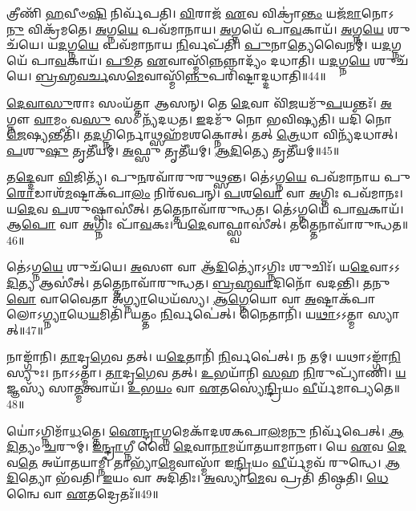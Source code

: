 𑌤𑍍𑌰𑍀𑌣𑌿᳴ \ul{𑌹}\-𑌵𑍀𑍞\-\ul{𑌷𑌿} 𑌨𑌿𑌰𑍍𑌵᳴𑌪𑌤𑌿।
\-\ul{𑌵𑌿}\-𑌰𑌾𑌜᳴ \ul{𑌏}\-𑌵 𑌵𑌿𑌕𑍍𑌰𑌾॑\-\ul{𑌨𑍍𑌤𑌂} 𑌯𑌜᳴\-\ul{𑌮𑌾}\-𑌨𑍋𑌽\-\ul{𑌨𑍁} 𑌵𑌿𑌕𑍍𑌰᳴𑌮𑌤𑍇।
\-\ul{𑌅}\-𑌗𑍍𑌨\-\ul{𑌯𑍇} 𑌪𑌵᳴𑌮𑌾𑌨𑌾𑌯।
\-\ul{𑌅}\-𑌗𑍍𑌨𑌯𑍇᳴ 𑌪𑌾\-\ul{𑌵}\-𑌕𑌾𑌯᳴।
\-\ul{𑌅}\-𑌗𑍍𑌨\-\ul{𑌯𑍇} 𑌶𑍁𑌚᳴𑌯𑍇।
𑌯\-\ul{𑌦}\-𑌗𑍍𑌨\-\ul{𑌯𑍇} 𑌪𑌵᳴𑌮𑌾𑌨𑌾𑌯 \ul{𑌨𑌿}\-𑌰𑍍𑌵𑌪᳴𑌤𑌿।
\-\ul{𑌪𑍁}\-𑌨𑌾\-\ul{𑌤𑍍𑌯𑍇}\-𑌵𑍈𑌨𑌮𑍍॑।
𑌯\-\ul{𑌦}\-𑌗𑍍𑌨𑌯𑍇᳴ 𑌪𑌾\-\ul{𑌵}\-𑌕𑌾𑌯᳴।
\-\ul{𑌪𑍂}\-𑌤 \ul{𑌏}\-𑌵𑌾𑌸𑍍𑌮𑌿᳴\-\ul{𑌨𑍍𑌨}\-𑌨𑍍𑌨𑌾𑌦𑍍𑌯𑌂᳴ 𑌦𑌧𑌾𑌤𑌿।
𑌯\-\ul{𑌦}\-𑌗𑍍𑌨\-\ul{𑌯𑍇} 𑌶𑍁𑌚᳴𑌯𑍇।
\-\ul{𑌬𑍍𑌰}\-\-\ul{𑌹𑍍𑌮}\-\-\ul{𑌵}\-\-\ul{𑌰𑍍𑌚}\-𑌸\-\ul{𑌮𑍇}\-𑌵𑌾𑌸𑍍𑌮𑌿᳴\-\ul{𑌨𑍍𑌨𑍁}\-𑌪𑌰𑌿᳴𑌷𑍍𑌟𑌾𑌦𑍍𑌦𑌧𑌾𑌤𑌿॥44॥\anuvakamend[\-\ul{𑌏}\-\-\ul{𑌨}\-\-\ul{𑌮𑌾}\-\-\ul{𑌹}\-\-\ul{𑌵}\-𑌨𑍀𑌯𑌂᳴ 𑌧𑌤𑍍𑌤𑍇\-𑌽\-\ul{𑌶𑍍𑌵}\-𑌤𑍍𑌵𑌂 𑌵᳴𑌰𑍍𑌤𑌯𑌤𑌿 𑌕𑍁𑌰𑍁\-\ul{𑌤} 𑌇𑌤𑌿᳴ \ul{𑌰𑍁}\-𑌦𑍍𑌰𑍋 𑌦᳴𑌧𑌾\-\ul{𑌤𑌿} 𑌯\-\ul{𑌦}\-𑌗𑍍𑌨\-\ul{𑌯𑍇} 𑌶𑍁𑌚᳴\-\ul{𑌯} 𑌏𑌕𑌂᳴ 𑌚]

\-\ul{𑌦𑍇}\-\-\ul{𑌵𑌾}\-\-\ul{𑌸𑍁}\-𑌰𑌾𑌃 𑌸𑌂𑌯᳴𑌤𑍍𑌤𑌾 𑌆𑌸𑌨𑍍।
𑌤𑍇 \ul{𑌦𑍇}\-𑌵𑌾 𑌵𑌿᳴\-\ul{𑌜}\-𑌯𑌮𑍁᳴\-\ul{𑌪}\-𑌯𑌨𑍍𑌤𑌃᳴।
\-\ul{𑌅}\-𑌗𑍍𑌨𑍗 \ul{𑌵𑌾}\-𑌮𑌂 𑌵\-\ul{𑌸𑍁} 𑌸𑌂 𑌨𑍍𑌯᳴𑌦𑌧𑌤।
\-\ul{𑌇}\-𑌦𑌮𑍁᳴ 𑌨𑍋 𑌭𑌵𑌿𑌷𑍍𑌯𑌤𑌿।
𑌯𑌦𑌿᳴ 𑌨𑍋 \ul{𑌜𑍇}\-𑌷𑍍𑌯𑌨𑍍𑌤𑍀𑌤𑌿᳴।
𑌤\-\ul{𑌦}\-𑌗𑍍𑌨𑌿𑌰𑍍𑌨𑍋𑌥𑍍𑌸𑌹᳴𑌮𑌶𑌕𑍍𑌨𑍋𑌤𑍍।
𑌤𑌤𑍍 \ul{𑌤𑍍𑌰𑍇}\-𑌧𑌾 𑌵𑌿𑌨𑍍𑌯᳴𑌦𑌧𑌾𑌤𑍍।
\-\ul{𑌪}\-𑌶𑍁\-\ul{𑌷𑍁} 𑌤𑍃𑌤𑍀᳴𑌯𑌮𑍍।
\-\ul{𑌅}\-𑌫𑍍𑌸𑍁 𑌤𑍃𑌤𑍀᳴𑌯𑌮𑍍।
\-\ul{𑌆}\-\-\ul{𑌦𑌿}\-𑌤𑍍𑌯𑍇 𑌤𑍃𑌤𑍀᳴𑌯𑌮𑍍॥45॥

𑌤\-\ul{𑌦𑍍𑌦𑍇}\-𑌵𑌾 \ul{𑌵𑌿}\-𑌜𑌿𑌤𑍍𑌯᳴।
𑌪𑍁\-\ul{𑌨}\-𑌰𑌵𑌾᳴𑌰𑍁𑌰𑍁𑌥𑍍𑌸𑌨𑍍𑌤।
𑌤𑍇॑𑌽𑌗𑍍𑌨\-\ul{𑌯𑍇} 𑌪𑌵᳴𑌮𑌾𑌨𑌾𑌯 𑌪𑍁\-\ul{𑌰𑍋}\-𑌡𑌾𑌶᳴\-\ul{𑌮}\-𑌷𑍍𑌟𑌾\-𑌕᳴𑌪𑌾\-\ul{𑌲𑌂} 𑌨𑌿𑌰᳴𑌵𑌪𑌨𑍍।
\-\ul{𑌪}\-𑌶\-\ul{𑌵𑍋} 𑌵𑌾 \ul{𑌅}\-𑌗𑍍𑌨𑌿𑌃 𑌪𑌵᳴𑌮𑌾𑌨𑌃।
𑌯\-\ul{𑌦𑍇}\-𑌵 \ul{𑌪}\-𑌶𑍁𑌷𑍍𑌵𑌾𑌸𑍀॑𑌤𑍍।
𑌤𑌤𑍍𑌤𑍇𑌨𑌾𑌵𑌾᳴𑌰𑍁𑌨𑍍𑌧𑌤।
𑌤𑍇॑𑌽𑌗𑍍𑌨𑌯𑍇᳴ 𑌪𑌾\-\ul{𑌵}\-𑌕𑌾𑌯᳴।
𑌆\-\ul{𑌪𑍋} 𑌵𑌾 \ul{𑌅}\-𑌗𑍍𑌨𑌿𑌃 𑌪𑌾᳴\-\ul{𑌵}\-𑌕𑌃।
𑌯\-\ul{𑌦𑍇}\-𑌵𑌾𑌫𑍍𑌸𑍍𑌵𑌾𑌸𑍀॑𑌤𑍍।
𑌤𑌤𑍍𑌤𑍇𑌨𑌾𑌵𑌾᳴𑌰𑍁𑌨𑍍𑌧𑌤॥46॥

𑌤𑍇॑𑌽𑌗𑍍𑌨\-\ul{𑌯𑍇} 𑌶𑍁𑌚᳴𑌯𑍇।
\-\ul{𑌅}\-𑌸𑍗 𑌵𑌾 𑌆᳴\-\ul{𑌦𑌿}\-𑌤𑍍𑌯𑍋॑\-𑌽𑌗𑍍𑌨𑌿𑌃 𑌶𑍁𑌚𑌿𑌃᳴।
𑌯\-\ul{𑌦𑍇}\-𑌵𑌾𑌽𑌽\-\ul{𑌦𑌿}\-𑌤𑍍𑌯 𑌆𑌸𑍀॑𑌤𑍍।
𑌤𑌤𑍍𑌤𑍇𑌨𑌾𑌵𑌾᳴𑌰𑍁𑌨𑍍𑌧𑌤।
\-\ul{𑌬𑍍𑌰}\-\-\ul{𑌹𑍍𑌮}\-\-\ul{𑌵𑌾}\-𑌦𑌿𑌨𑍋᳴ 𑌵𑌦𑌨𑍍𑌤𑌿।
\-\ul{𑌤}\-𑌨𑍁\-\ul{𑌵𑍋} 𑌵𑌾𑌵𑍈𑌤𑌾 𑌅᳴\-\ul{𑌗𑍍𑌨𑍍𑌯𑌾}\-𑌧𑍇𑌯᳴𑌸𑍍𑌯।
\-\ul{𑌆}\-\-\ul{𑌗𑍍𑌨𑍇}\-𑌯𑍋 𑌵𑌾 \ul{𑌅}\-𑌷𑍍𑌟𑌾\-𑌕᳴𑌪𑌾𑌲𑍋\-𑌽\-\ul{𑌗𑍍𑌨𑍍𑌯𑌾}\-𑌧𑍇\-\ul{𑌯}\-𑌮𑌿𑌤𑌿᳴।
𑌯𑌤𑍍𑌤𑌂 \ul{𑌨𑌿}\-𑌰𑍍𑌵𑌪𑍇॑𑌤𑍍।
𑌨𑍈𑌤𑌾𑌨𑌿᳴।
𑌯\-\ul{𑌥𑌾}\-𑌽𑌽𑌤𑍍𑌮𑌾 𑌸𑍍𑌯𑌾𑌤𑍍॥47॥

𑌨𑌾𑌙𑍍𑌗𑌾᳴𑌨𑌿।
\-\ul{𑌤𑌾}\-𑌦𑍃\-\ul{𑌗𑍇}\-𑌵 𑌤𑌤𑍍।
𑌯\-\ul{𑌦𑍇}\-𑌤𑌾𑌨𑌿᳴ \ul{𑌨𑌿}\-𑌰𑍍𑌵𑌪𑍇॑𑌤𑍍।
𑌨 𑌤𑌮𑍍।
𑌯𑌥𑌾𑌽𑌙𑍍𑌗𑌾᳴\-\ul{𑌨𑌿} 𑌸𑍍𑌯𑍁𑌃।
𑌨𑌾𑌽𑌽𑌤𑍍𑌮𑌾।
\-\ul{𑌤𑌾}\-𑌦𑍃\-\ul{𑌗𑍇}\-𑌵 𑌤𑌤𑍍।
\-\ul{𑌉}\-𑌭𑌯𑌾᳴𑌨𑌿 \ul{𑌸}\-𑌹 \ul{𑌨𑌿}\-𑌰𑍁𑌪𑍍𑌯𑌾᳴𑌣𑌿।
\-\ul{𑌯}\-𑌜𑍍𑌞𑌸𑍍𑌯᳴ 𑌸𑌾\-\ul{𑌤𑍍𑌮}\-𑌤𑍍𑌵𑌾𑌯᳴।
\-\ul{𑌉}\-𑌭\-\ul{𑌯𑌂} 𑌵𑌾 \ul{𑌏}\-𑌤𑌸𑍍𑌯𑍇॑\-\ul{𑌨𑍍𑌦𑍍𑌰𑌿}\-𑌯𑌂 \ul{𑌵𑍀}\-𑌰𑍍𑌯᳴𑌮𑌾𑌪𑍍𑌯𑌤𑍇॥48॥

𑌯𑍋॑𑌽𑌗𑍍𑌨𑌿𑌮𑌾᳴\-\ul{𑌧}\-𑌤𑍍𑌤𑍇।
\-\ul{𑌐}\-\-\ul{𑌨𑍍𑌦𑍍𑌰𑌾}\-𑌗𑍍𑌨𑌮𑍇𑌕𑌾᳴\-𑌦𑌶\-𑌕𑌪𑌾\-\ul{𑌲}\-𑌮\-\ul{𑌨𑍁} 𑌨𑌿𑌰𑍍𑌵᳴𑌪𑍇𑌤𑍍।
\-\ul{𑌆}\-\-\ul{𑌦𑌿}\-𑌤𑍍𑌯𑌂 \ul{𑌚}\-𑌰𑍁𑌮𑍍।
\-\ul{𑌇}\-\-\ul{𑌨𑍍𑌦𑍍𑌰𑌾}\-𑌗𑍍𑌨𑍀 𑌵𑍈 \ul{𑌦𑍇}\-𑌵𑌾\-\ul{𑌨𑌾}\-𑌮𑌯𑌾᳴𑌤𑌯𑌾𑌮𑌾𑌨𑍗।
𑌯𑍇 \ul{𑌏}\-𑌵 \ul{𑌦𑍇}\-𑌵\-\ul{𑌤𑍇} 𑌅𑌯𑌾᳴𑌤𑌯𑌾𑌮𑍍𑌨𑍀।
𑌤𑌾𑌭𑍍𑌯𑌾᳴\-\ul{𑌮𑍇}\-𑌵𑌾𑌸𑍍𑌮𑌾᳴ 𑌇\-\ul{𑌨𑍍𑌦𑍍𑌰𑌿}\-𑌯𑌂 \ul{𑌵𑍀}\-𑌰𑍍𑌯᳴𑌮𑌵᳴ 𑌰𑍁𑌨𑍍𑌧𑍇।
\-\ul{𑌆}\-\-\ul{𑌦𑌿}\-𑌤𑍍𑌯𑍋 𑌭᳴𑌵𑌤𑌿।
\-\ul{𑌇}\-𑌯𑌂 𑌵𑌾 𑌅𑌦𑌿᳴𑌤𑌿𑌃।
\-\ul{𑌅}\-𑌸𑍍𑌯𑌾\-\ul{𑌮𑍇}\-𑌵 𑌪𑍍𑌰𑌤𑌿᳴ 𑌤𑌿𑌷𑍍𑌠𑌤𑌿।
\-\ul{𑌧𑍇}\-𑌨𑍍𑌵𑍈 𑌵𑌾 \ul{𑌏}\-𑌤𑌦𑍍𑌰𑍇𑌤𑌃᳴॥49॥

